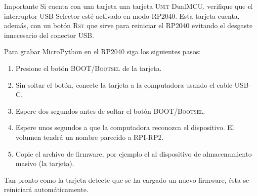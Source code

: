 \begin{greenbox}{Importante}
	Si cuenta con una tarjeta una tarjeta \textsc{Unit} DualMCU, verifique que el interruptor USB-Selector esté activado en modo RP2040.
	Esta tarjeta cuenta, además, con un botón \textsc{Rst} que sirve para reiniciar el RP2040 evitando el desgaste innecesario del conector USB.
\end{greenbox}

\noindent
Para grabar MicroPython en el RP2040 siga los siguientes pasos:

\begin{enumerate}[nosep]
	\item Presione el botón BOOT/\textsc{Bootsel} de la tarjeta.
	\item Sin soltar el botón, conecte la tarjeta a la computadora usando el cable USB-C.
	\item Espere dos segundos antes de soltar el botón BOOT/\textsc{Bootsel}.
	\item Espere unos segundos a que la computadora reconozca el dispositivo.\footnotemark{}
	El volumen tendrá un nombre parecido a RPI-RP2.
	\item Copie el archivo de firmware, por ejemplo el  al dispositivo de almacenamiento masivo (la tarjeta).
\end{enumerate}

\medskip{}

\noindent
Tan pronto como la tarjeta detecte que se ha cargado un nuevo firmware, ésta se reiniciará automáticamente.
